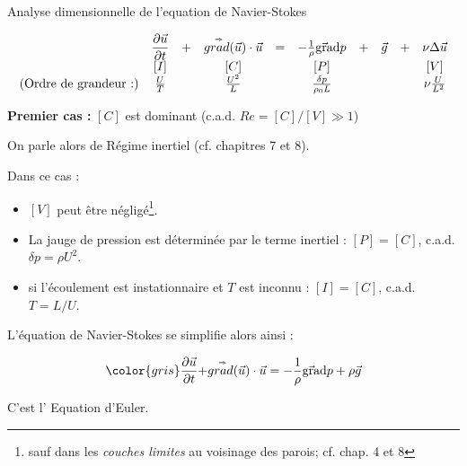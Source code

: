 \begin{frame}{Analyse dimensionnelle de l'equation de Navier-Stokes} 
\small

$$ 
\begin{array}{lccccccccc} 
\displaystyle
 &
\displaystyle \frac{\partial \vec{u}}{\partial t} & + &  \accentset{\Rightarrow}{grad} (\vec{u}) \cdot \vec{u} 
&=& 
 - \frac{1}{\rho}  \vec{\mbox{\rm gra}}\mbox{\rm d} p &+& \vec{g}  &+ & \nu \Delta \vec{u} 
 \\
\displaystyle
&
\left[I\right] && \left[ C \right] && \left[P\right]  && &&\left[V\right] 
\\
\displaystyle
\mbox{(Ordre de grandeur :)} &
\frac{U}{T}  && \frac{U^2}{L} && \frac{\delta p }{\rho_0 L} && && \nu \frac{U}{L^2}
\end{array}
$$

\pause
\bigskip


{\bf Premier cas :} $[C]$ est dominant (c.a.d. $Re = [C]/[V] \gg 1$) 
\pause
\smallskip

On parle alors de {\color{rouge} Régime inertiel} (cf. chapitres 7 et 8). 

\pause 
\medskip

Dans ce cas :

\begin{itemize}
\item $[V]$ peut être négligé\footnote{sauf dans les {\em couches limites} au voisinage des parois; cf. chap. 4 et 8}.

\item La jauge de pression est déterminée par le terme inertiel : $[P] = [C]$, c.a.d. $\delta p = \rho U^2$.  

\item {\color{gris} si l'écoulement est instationnaire et $T$ est inconnu :  $[I] = [C]$, c.a.d. $T = L/U$}.  

\end{itemize}

L'équation de Navier-Stokes se simplifie alors ainsi :

$$
{\color{gris} \dpdt{\myvec{u}} +}   \mytensor{grad} (\myvec{u}) \cdot \myvec{u} 
= 
 - \frac{1}{\rho}  \gradient p + \rho \vec{g}  
$$

\smallskip
 
C'est l'{\color{red} Equation d'Euler}.


\end{frame}



